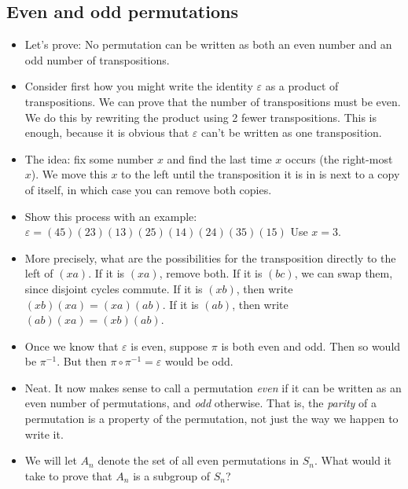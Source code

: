 \documentclass[12pt]{article}
\theoremstyle{plain}
\theoremstyle{definition}
\theoremstyle{remark}
\def\inv{^{-1}}
\newcommand{\todayis}[1]{\clearpage{\rhead{\footnotesize #1}}}
\begin{document}
\todayis{Monday, February 25} 
\subsection*{Even and odd permutations}
\begin{itemize}
  \item Let's prove:  No permutation can be written as both an even number and an odd number of transpositions.

  \item Consider first how you might write the identity $\varepsilon$ as a product of transpositions.  We can prove that the number of transpositions must be even.  We do this by rewriting the product using 2 fewer transpositions.  This is enough, because it is obvious that $\varepsilon$ can't be written as one transposition.

  \item The idea: fix some number $x$ and find the last time $x$ occurs (the right-most $x$).  We move this $x$ to the left until the transposition it is in is next to a copy of itself, in which case you can remove both copies.

  \item Show this process with an example: $\varepsilon = (45)(23)(13)(25)(14)(24)(35)(15)$  Use $x = 3$. 

  \item More precisely, what are the possibilities for the transposition directly to the left of $(xa)$.  If it is $(xa)$, remove both.  If it is $(bc)$, we can swap them, since disjoint cycles commute.  If it is $(xb)$, then write $(xb)(xa) = (xa)(ab)$.  If it is $(ab)$, then write $(ab)(xa) = (xb)(ab)$.   

  \item Once we know that $\varepsilon$ is even, suppose $\pi$ is both even and odd.  Then so would be $\pi\inv$.  But then $\pi\circ \pi\inv = \varepsilon$ would be odd.
  
  \item Neat.  It now makes sense to call a permutation \emph{even} if it can be written as an even number of permutations, and \emph{odd} otherwise.  That is, the \emph{parity} of a permutation is a property of the permutation, not just the way we happen to write it.
  
  \item We will let $A_n$ denote the set of all even permutations in $S_n$.  What would it take to prove that $A_n$ is a subgroup of $S_n$?
  

\end{itemize}
\end{document}
